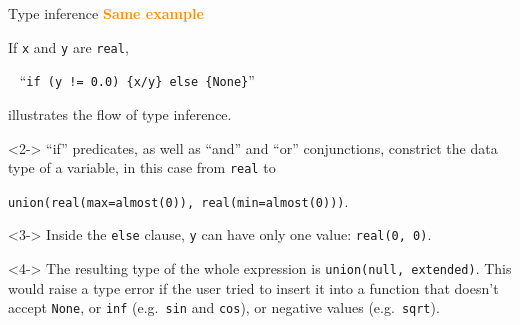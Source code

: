 \documentclass{beamer}
\begin{document}
\begin{frame}{Type inference}
\vspace{0.3 cm}
\textcolor{darkorange}{\bf Same example}

If {\tt x} and {\tt y} are {\tt real},

\vspace{0.2 cm}
\mbox{ } \hfill ``{\tt if (y != 0.0) \{x/y\} else \{None\}}'' \hfill \mbox{ }

\vspace{0.2 cm}
illustrates the flow of type inference.

\vspace{0.5 cm}
\begin{uncoverenv}<2->
``if'' predicates, as well as ``and'' and ``or'' conjunctions, constrict the data type of a variable, in this case from {\tt real} to

\mbox{\tt union(real(max=almost(0)), real(min=almost(0)))}.
\end{uncoverenv}

\begin{uncoverenv}<3->
Inside the {\tt else} clause, {\tt y} can have only one value: {\tt real(0, 0)}.
\end{uncoverenv}

\begin{uncoverenv}<4->
The resulting type of the whole expression is {\tt union(null, extended)}. This would raise a type error if the user tried to insert it into a function that doesn't accept {\tt None}, or {\tt inf} (e.g.\ {\tt sin} and {\tt cos}), or negative values (e.g.\ {\tt sqrt}).
\end{uncoverenv}
\end{frame}
\end{document}
